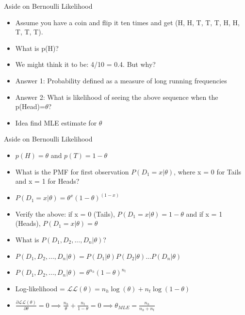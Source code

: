 \documentclass{beamer}
\begin{document}

\begin{frame}{Aside on Bernoulli Likelihood}
\begin{itemize}[<+->]
\item Assume you have a coin and flip it ten times and get (H, H, T, T, T, H, H, T, T, T).
\item What is p(H)?
\item We might think it to be: 4/10 = 0.4. But why?
\item Answer 1: Probability defined as a measure of long running frequencies
\item Answer 2: What is likelihood of seeing the above sequence when the p(Head)=$\theta$?
\item Idea find MLE estimate for $\theta$
\end{itemize}

\end{frame}

\begin{frame}{Aside on Bernoulli Likelihood}
\begin{itemize}[<+->]
\item $p(H) = \theta$ and $p(T) = 1 - \theta$
\item What is the PMF for first observation $P(D_1 = x|\theta)$, where x = 0 for Tails and x = 1 for Heads?
\item $P(D_1 = x|\theta) = \theta^x(1-\theta)^{(1-x)}$
\item Verify the above: if x = 0 (Tails), $P(D_1 = x|\theta) = 1 - \theta$ and if x = 1 (Heads), $P(D_1 = x|\theta)  = \theta$
\item What is $P(D_1, D_2, ..., D_n|\theta)$?
\item $P(D_1, D_2, ..., D_n|\theta) = P(D_1|\theta)P(D_2|\theta)...P(D_n|\theta)$
\item $P(D_1, D_2, ..., D_n|\theta) =\theta^{n_h}(1-\theta)^{n_t}$
\item Log-likelihood = $\mathcal{LL}(\theta) = n_h\log(\theta) + n_t\log(1-\theta)$
\item $\frac{\partial \mathcal{LL}(\theta)}{\partial \theta} = 0 \implies \frac{n_h}{\theta} + \frac{n_t}{1-\theta} = 0 \implies \theta_{MLE} = \frac{n_h}{n_h + n_t}$

\end{itemize}

\end{frame}
\end{document}

